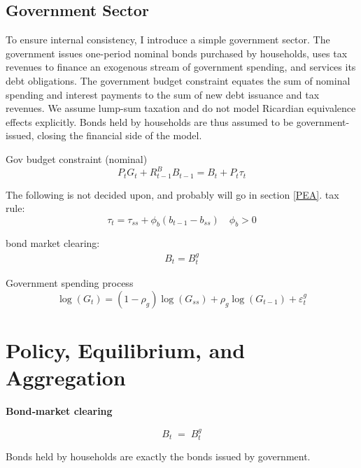 \documentclass[11pt,preprint]{elsarticle}
\numberwithin{equation}{section}
\numberwithin{figure}{section}
\numberwithin{table}{section}
\begin{document}
\newpage

\subsection{Government Sector}\label{government-sector}

To ensure internal consistency, I introduce a simple government sector.
The government issues one-period nominal bonds purchased by households,
uses tax revenues to finance an exogenous stream of government spending,
and services its debt obligations. The government budget constraint
equates the sum of nominal spending and interest payments to the sum of
new debt issuance and tax revenues. We assume lump-sum taxation and do
not model Ricardian equivalence effects explicitly. Bonds held by
households are thus assumed to be government-issued, closing the
financial side of the model.

Gov budget constraint (nominal) \begin{equation}
P_t G_t + R^B_{t-1} B_{t-1} = B_t + P_t \tau_t \label{Gov_Budget}
\end{equation}

The following is not decided upon, and probably will go in section
\ref{PEA}. tax rule: \begin{equation}
\tau_t = \tau_{ss} + \phi_b (b_{t-1} - b_{ss}) \quad \phi_b > 0 \label{Tax_Rule}
\end{equation}

bond market clearing: \begin{align*}
B_t = B^g_t 
\end{align*}

Government spending process \begin{equation}
\log(G_t) = (1-\rho_g)\log(G_{ss}) + \rho_g \log(G_{t-1}) + \varepsilon^g_t \label{Gov_Spending}
\end{equation}

\section{\texorpdfstring{Policy, Equilibrium, and Aggregation
\label{PEA}}{Policy, Equilibrium, and Aggregation }}\label{policy-equilibrium-and-aggregation}

\textbf{Bond‐market clearing}

\[
     B_t \;=\; B^g_t
     \tag{Bond market clear}
   \]

Bonds held by households are exactly the bonds issued by government.
\end{document}
